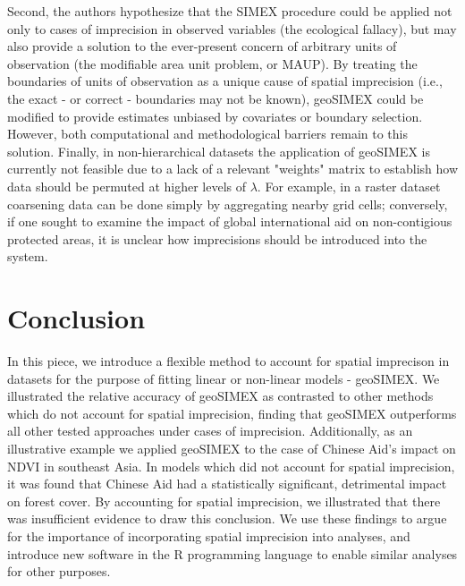 Second, the authors hypothesize that the SIMEX procedure could be applied not only to cases of imprecision in observed variables (the ecological fallacy), but may also provide a solution to the ever-present concern of arbitrary units of observation (the modifiable area unit problem, or MAUP).
By treating the boundaries of units of observation as a unique cause of spatial imprecision (i.e., the exact - or correct - boundaries may not be known), geoSIMEX could be modified to provide estimates unbiased by covariates or boundary selection.
However, both computational and methodological barriers remain to this solution.
Finally, in non-hierarchical datasets the application of geoSIMEX is currently not feasible due to a lack of a relevant "weights" matrix to establish how data should be permuted at higher levels of $\lambda$.
For example, in a raster dataset coarsening data can be done simply by aggregating nearby grid cells; conversely, if one sought to examine the impact of global international aid on non-contigious protected areas, it is unclear how imprecisions should be introduced into the system.


\newpage

\section{Conclusion}
In this piece, we introduce a flexible method to account for spatial imprecison in datasets for the purpose of fitting linear or non-linear models - geoSIMEX.
We illustrated the relative accuracy of geoSIMEX as contrasted to other methods which do not account for spatial imprecision, finding that geoSIMEX outperforms all other tested approaches under cases of imprecision.
Additionally, as an illustrative example we applied geoSIMEX to the case of Chinese Aid's impact on NDVI in southeast Asia.  
In models which did not account for spatial imprecision, it was found that Chinese Aid had a statistically significant, detrimental impact on forest cover.
By accounting for spatial imprecision, we illustrated that there was insufficient evidence to draw this conclusion.
We use these findings to argue for the importance of incorporating spatial imprecision into analyses, and introduce new software in the R programming language to enable similar analyses for other purposes.
\newpage

